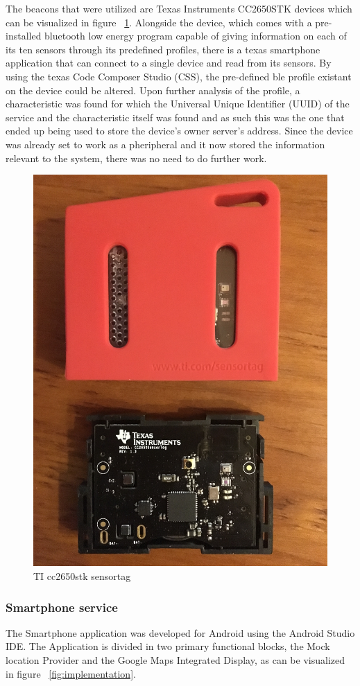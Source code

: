 \documentclass[a4paper]{IEEEtran}
\begin{document}
The beacons that were utilized are Texas Instruments CC2650STK devices which can be visualized in figure ~\ref{fig:beacon}. Alongside the device, which comes with a pre-installed bluetooth low energy program capable of giving information on each of its ten sensors through its predefined profiles, there is a texas smartphone application that can connect to a single device and read from its sensors. By using the texas Code Composer Studio (CSS), the pre-defined ble profile existant on the device could be altered. Upon further analysis of the profile, a characteristic was found for which the Universal Unique Identifier (UUID) of the service and the characteristic itself was found and as such this was the one that ended up being used to store the device's owner server's address. Since the device was already set to work as a pheripheral and it now stored the information relevant to the system, there was no need to do further work.

\begin{figure}
	\centering
		\includegraphics[width=0.5\linewidth]{figures/beacon.jpg}
	\caption[TI cc2650stk sensortag]{TI cc2650stk sensortag}
	\label{fig:beacon}
\end{figure}

\subsubsection{ Smartphone service}
\label{subsec:service}

The Smartphone application was developed for Android using the Android Studio IDE. The Application is divided in two primary functional blocks, the Mock location Provider and the Google Maps Integrated Display, as can be visualized in figure ~\ref{fig:implementation}.
\end{document}
